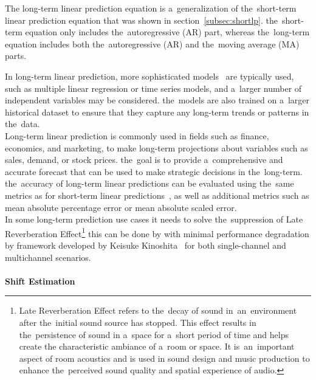 The long-term linear prediction equation is a~generalization of the~short-term linear prediction equation that was shown in section~\ref{subsec:shortlp}. the~short-term equation only includes the~autoregressive (AR) part, whereas the~long-term equation includes both the~autoregressive (AR) and the~moving average (MA) parts.

In long-term linear prediction, more sophisticated models~\cite{Nave} are typically used, such as multiple linear
regression or time series models, and a~larger number of independent variables may be considered. the~models are also
trained on a~larger historical dataset to ensure that they capture any long-term trends or patterns in the~data.
\\
Long-term linear prediction is commonly used in fields such as finance, economics, and marketing, to make long-term
projections about variables such as sales, demand, or stock prices. the~goal is to provide a~comprehensive and accurate
forecast that can be used to make strategic decisions in the~long-term. the~accuracy of long-term linear predictions
can be evaluated using the~same metrics as for short-term linear predictions~\cite{Baker}, as well as additional metrics
such as mean absolute percentage error or mean absolute scaled error.
\\
In some long-term prediction use cases it needs to solve the~suppression of Late Reverberation
Effect\footnote{Late Reverberation Effect refers to the~decay of sound in~an~environment after the~initial sound source
has stopped. This effect results in the~persistence of sound in a~space for a~short period of time and helps create the
characteristic ambiance of a~room or space. It is~an~important aspect of room acoustics and is used in sound
design and music production to enhance the~perceived sound quality and spatial experience of audio.} this can be done
by with minimal performance degradation by framework developed by Keisuke Kinoshita~\cite{Kinoshita} for both
single-channel and multichannel scenarios.\\
\\
\textbf{Shift Estimation}\\

